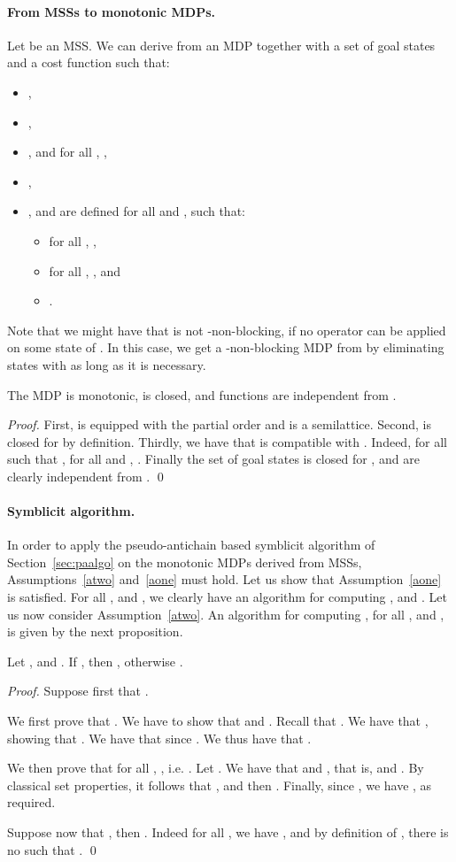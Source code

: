 \paragraph{From MSSs to monotonic MDPs.} Let  be an MSS. We can derive from  an MDP  together with a set of goal states  and a cost function  such that:
\begin{itemize}
\itemsep0.1em
\item ,
\item ,
\item , and for all , ,
\item ,
\item ,  and  are defined for all  and , such that:
\begin{itemize} 
\item for all , ,
\item for all , , and
\item .
\end{itemize}
\end{itemize}
Note that we might have that  is not -non-blocking, if no operator can be applied on some state of . In this case, we get a -non-blocking MDP from  by eliminating states  with   as long as it is necessary.

\begin{lemma} \label{lem:StripsMono}
The MDP  is monotonic,  is closed, and functions  are independent from .
\end{lemma}
\begin{proof}
First,  is equipped with the partial order  and  is a semilattice. Second,  is closed for  by definition. 
Thirdly,  we have that  is compatible with . Indeed, for all  such that , for all  and , . Finally the set  of goal states is closed for , and  are clearly independent from .
\qed\end{proof}

\paragraph{Symblicit algorithm.} In order to apply the pseudo-antichain based symblicit algorithm of Section~\ref{sec:paalgo} on the monotonic MDPs derived from MSSs, Assumptions~\ref{atwo} and~\ref{aone} must hold. Let us show that Assumption~\ref{aone} is satisfied. For all ,  and , we clearly have an algorithm for computing , and . Let us now consider Assumption~\ref{atwo}. An algorithm for computing , for all ,  and , is given by the next proposition. 
\begin{proposition}
Let ,  and . If , then  , otherwise .
\end{proposition}
\begin{proof}
Suppose first that .

We first prove that .  We have to show that  and  . Recall that . We have that , showing that . We have that  since . We thus have that .

We then prove that for all , , i.e. . Let . We have that  and , that is,   and . By classical set properties, it follows that , and then . Finally, since , we have , as required.

Suppose now that , then . Indeed for all , we have  , and by definition of , there is no  such that .
\qed\end{proof}

